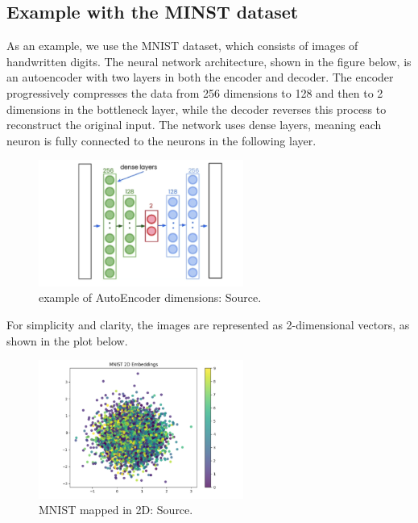 \subsection{Example with the MINST dataset}
As an example, we use the MNIST dataset, which consists of images of handwritten digits. The neural network architecture, shown in the figure below, is an autoencoder with two layers in both the encoder and decoder. The encoder progressively compresses the data from 256 dimensions to 128 and then to 2 dimensions in the bottleneck layer, while the decoder reverses this process to reconstruct the original input. The network uses dense layers, meaning each neuron is fully connected to the neurons in the following layer.
\begin{figure}[h]
    \centering
    \includegraphics[width=0.6\textwidth]{IMAGES/immagine_2025-02-26_154914801.png}
    \caption[Example of AutoEncoder]{example of AutoEncoder dimensions:
 Source.\footnotemark[3]}
    \label{fig:2D}
\end{figure}

For simplicity and clarity, the images are represented as 2-dimensional vectors, as shown in the plot below.

\begin{figure}[h]
    \centering
    \includegraphics[width=0.6\textwidth]{IMAGES/immagine_2025-02-26_155006209.png}
    \caption[MNIST 2D]{MNIST mapped in 2D:
 Source.\footnotemark[3]}
    \label{fig:2D}
\end{figure}


